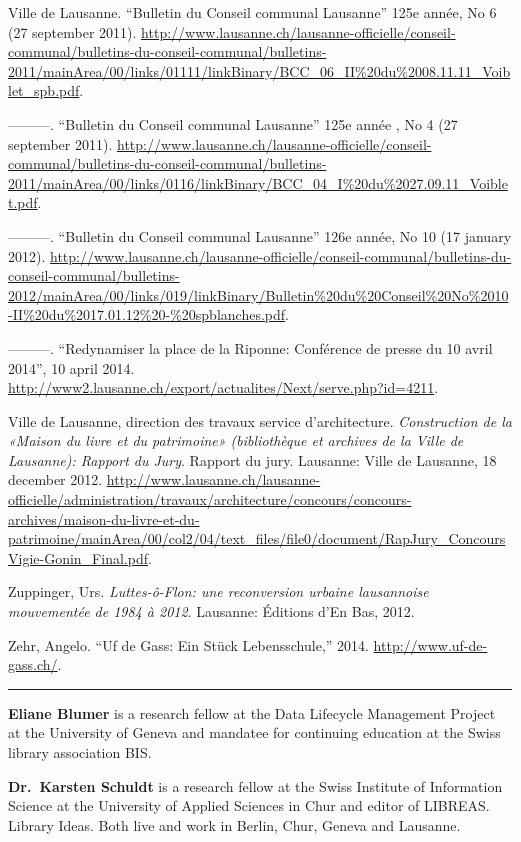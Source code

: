 \documentclass[a4paper,
fontsize=11pt,
oneside,
numbers=noperiodatend,
parskip=half-,
bibliography=totoc,
final
]{scrartcl}
\begin{document}
Ville de Lausanne. \enquote{Bulletin du Conseil communal Lausanne} 125e
année, No 6 (27 september 2011).
\url{http://www.lausanne.ch/lausanne-officielle/conseil-communal/bulletins-du-conseil-communal/bulletins-2011/mainArea/00/links/01111/linkBinary/BCC_06_II\%20du\%2008.11.11_Voiblet_spb.pdf}.

---------. \enquote{Bulletin du Conseil communal Lausanne} 125e année ,
No 4 (27 september 2011).
\url{http://www.lausanne.ch/lausanne-officielle/conseil-communal/bulletins-du-conseil-communal/bulletins-2011/mainArea/00/links/0116/linkBinary/BCC_04_I\%20du\%2027.09.11_Voiblet.pdf}.

---------. \enquote{Bulletin du Conseil communal Lausanne} 126e année,
No 10 (17 january 2012).
\url{http://www.lausanne.ch/lausanne-officielle/conseil-communal/bulletins-du-conseil-communal/bulletins-2012/mainArea/00/links/019/linkBinary/Bulletin\%20du\%20Conseil\%20No\%2010-II\%20du\%2017.01.12\%20-\%20spblanches.pdf}.

---------. \enquote{Redynamiser la place de la Riponne: Conférence de
presse du 10 avril 2014}, 10 april 2014.
\url{http://www2.lausanne.ch/export/actualites/Next/serve.php?id=4211}.

Ville de Lausanne, direction des travaux service d'architecture.
\emph{Construction de la «Maison du livre et du patrimoine»
(bibliothèque et archives de la Ville de Lausanne): Rapport du Jury}.
Rapport du jury. Lausanne: Ville de Lausanne, 18 december 2012.
\url{http://www.lausanne.ch/lausanne-officielle/administration/travaux/architecture/concours/concours-archives/maison-du-livre-et-du-patrimoine/mainArea/00/col2/04/text_files/file0/document/RapJury_ConcoursVigie-Gonin_Final.pdf}.

Zuppinger, Urs. \emph{Luttes-ô-Flon: une reconversion urbaine
lausannoise mouvementée de 1984 à 2012}. Lausanne: Éditions d'En Bas,
2012.

Zehr, Angelo. \enquote{Uf de Gass: Ein Stück Lebensschule,} 2014.
\url{http://www.uf-de-gass.ch/}.

\begin{center}\rule{0.5\linewidth}{\linethickness}\end{center}

\textbf{Eliane Blumer} is a research fellow at the Data Lifecycle
Management Project at the University of Geneva and mandatee for
continuing education at the Swiss library association BIS.

\textbf{Dr.~Karsten Schuldt} is a research fellow at the Swiss Institute
of Information Science at the University of Applied Sciences in Chur and
editor of LIBREAS. Library Ideas. Both live and work in Berlin, Chur,
Geneva and Lausanne.
\end{document}
